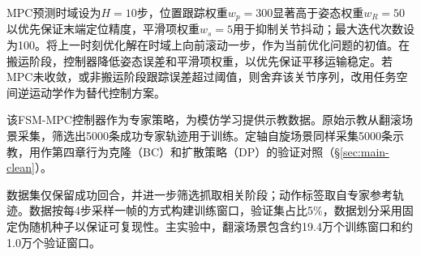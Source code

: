 MPC预测时域设为$H=10$步，位置跟踪权重$w_p=300$显著高于姿态权重$w_R=50$以优先保证末端定位精度，平滑项权重$w_s=5$用于抑制关节抖动；最大迭代次数设为100。将上一时刻优化解在时域上向前滚动一步，作为当前优化问题的初值。在搬运阶段，控制器降低姿态误差和平滑项权重，以优先保证平移运输稳定。若MPC未收敛，或非搬运阶段跟踪误差超过阈值，则舍弃该关节序列，改用任务空间逆运动学作为替代控制方案。

该FSM-MPC控制器作为专家策略，为模仿学习提供示教数据。原始示教从翻滚场景采集，筛选出5000条成功专家轨迹用于训练。定轴自旋场景同样采集5000条示教，用作第四章行为克隆（BC）和扩散策略（DP）的验证对照（\S\ref{sec:main-clean}）。

数据集仅保留成功回合，并进一步筛选抓取相关阶段；动作标签取自专家参考轨迹。数据按每4步采样一帧的方式构建训练窗口，验证集占比5\%，数据划分采用固定伪随机种子以保证可复现性。主实验中，翻滚场景包含约19.4万个训练窗口和约1.0万个验证窗口。
